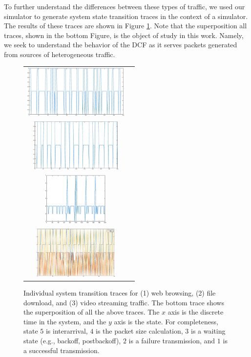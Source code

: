 \documentclass[conference]{IEEEtran}
\begin{document}
To further understand the differences between these types of traffic, we used our simulator to generate system state transition traces in the context of a simulator. The results of these traces are shown in Figure \ref{fig:traces}. Note that the superposition all traces, shown in the bottom Figure, is the object of study in this work. Namely, we seek to understand the behavior of the DCF as it serves packets generated from sources of heterogeneous traffic.

\begin{figure}
\begin{tabular}{cc}
\includegraphics[width=\textwidth,height=100px]{../../src/results/browse_time.eps} \\
\includegraphics[width=\textwidth,height=100px]{../../src/results/file_time.eps} \\
\includegraphics[width=\textwidth,height=100px]{../../src/results/video_time.eps} \\
\includegraphics[width=\textwidth,height=100px]{../../src/results/all.eps} \\
\end{tabular}
\caption{Individual system transition traces for (1) web browsing, (2) file download, and (3) video streaming traffic. The bottom trace shows the superposition of all the above traces. The $x$ axis is the discrete time in the system, and the $y$ axis is the state. For completeness, state $5$ is interarrival, $4$ is the packet size calculation, $3$ is a waiting state (e.g., backoff, postbackoff), $2$ is a failure transmission, and $1$ is a successful transmission.}
\label{fig:traces}
\end{figure}
\end{document}
